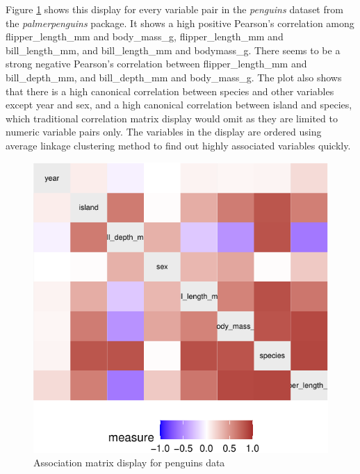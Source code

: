 Figure \ref{fig:assoc-heatmap} shows this display for every variable
pair in the \emph{penguins} dataset from the \emph{palmerpenguins}
package. It shows a high positive Pearson's correlation among
flipper\_length\_mm and body\_mass\_g, flipper\_length\_mm and
bill\_length\_mm, and bill\_length\_mm and bodymass\_g. There seems to
be a strong negative Pearson's correlation between flipper\_length\_mm
and bill\_depth\_mm, and bill\_depth\_mm and body\_mass\_g. The plot
also shows that there is a high canonical correlation between species
and other variables except year and sex, and a high canonical
correlation between island and species, which traditional correlation
matrix display would omit as they are limited to numeric variable pairs
only. The variables in the display are ordered using average linkage
clustering method to find out highly associated variables quickly.

\begin{Schunk}
\begin{figure}

{\centering \includegraphics{rj_paper_files/figure-latex/assoc-heatmap-1} 

}

\caption[Association matrix display for penguins data]{Association matrix display for penguins data}\label{fig:assoc-heatmap}
\end{figure}
\end{Schunk}

